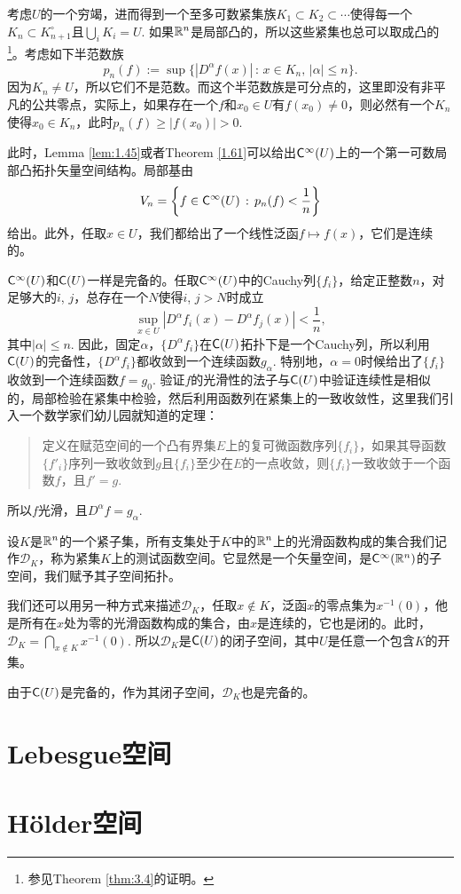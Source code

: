 \begin{para}
考虑$U$的一个穷竭，进而得到一个至多可数紧集族$K_1\subset K_2\subset \cdots$使得每一个$K_n\subset K_{n+1}^\circ$且$\bigcup_i K_i=U$. 如果$\mathbb{R}^n$是局部凸的，所以这些紧集也总可以取成凸的\footnote{参见Theorem \ref{thm:3.4}的证明。}。考虑如下半范数族
\[
	p_n(f):=\sup\{|D^\alpha f(x)|\,:\,x\in K_n,\, |\alpha|\leq n\}.
\]
因为$K_n\neq U$，所以它们不是范数。而这个半范数族是可分点的，这里即没有非平凡的公共零点，实际上，如果存在一个$f$和$x_0\in U$有$f(x_0)\neq 0$，则必然有一个$K_n$使得$x_0\in K_n$，此时$p_n(f)\geq |f(x_0)|>0$.

此时，Lemma \ref{lem:1.45}或者Theorem \ref{1.61}可以给出$\mathsf{C}^\infty(U)$上的一个第一可数局部凸拓扑矢量空间结构。局部基由
\[
	V_n=\left\{f\in \mathsf{C}^\infty(U)\,:\, p_n(f)<\frac 1n \right\}
\]
给出。此外，任取$x\in U$，我们都给出了一个线性泛函$f\mapsto f(x)$，它们是连续的。

$\mathsf{C}^\infty(U)$和$\mathsf{C}(U)$一样是完备的。任取$\mathsf{C}^\infty(U)$中的Cauchy列$\{f_i\}$，给定正整数$n$，对足够大的$i$, $j$，总存在一个$N$使得$i$, $j>N$时成立
\[
	\sup_{x\in U}\left|D^\alpha f_i(x)-D^\alpha f_j(x)\right|<\frac 1n,
\]
其中$|\alpha|\leq n$. 因此，固定$\alpha$，$\{D^\alpha f_i\}$在$\mathsf{C}(U)$拓扑下是一个Cauchy列，所以利用$\mathsf{C}(U)$的完备性，$\{D^\alpha f_i\}$都收敛到一个连续函数$g_\alpha$. 特别地，$\alpha=0$时候给出了$\{f_i\}$收敛到一个连续函数$f=g_0$. 验证$f$的光滑性的法子与$\mathsf{C}(U)$中验证连续性是相似的，局部检验在紧集中检验，然后利用函数列在紧集上的一致收敛性，这里我们引入一个数学家们幼儿园就知道的定理：
\begin{quote}
定义在赋范空间的一个凸有界集$E$上的复可微函数序列$\{f_i\}$，如果其导函数$\{f'_i\}$序列一致收敛到$g$且$\{f_i\}$至少在$E$的一点收敛，则$\{f_i\}$一致收敛于一个函数$f$，且$f'=g$.
\end{quote}
所以$f$光滑，且$D^\alpha f=g_\alpha$.
\end{para}

\begin{para}[测试函数空间]
设$K$是$\mathbb{R}^n$的一个紧子集，所有支集处于$K$中的$\mathbb{R}^n$上的光滑函数构成的集合我们记作$\mathscr D_K$，称为紧集$K$上的测试函数空间。它显然是一个矢量空间，是$\mathsf{C}^\infty(\mathbb{R}^n)$的子空间，我们赋予其子空间拓扑。

我们还可以用另一种方式来描述$\mathscr D_K$，任取$x\not\in K$，泛函$x$的零点集为$x^{-1}(0)$，他是所有在$x$处为零的光滑函数构成的集合，由$x$是连续的，它也是闭的。此时，$\mathscr D_K=\bigcap_{x\not\in K}x^{-1}(0)$. 所以$\mathscr D_K$是$\mathsf{C}(U)$的闭子空间，其中$U$是任意一个包含$K$的开集。

由于$\mathsf{C}(U)$是完备的，作为其闭子空间，$\mathscr D_K$也是完备的。
\end{para}

\section{Lebesgue空间}

\section{H\"{o}lder空间}